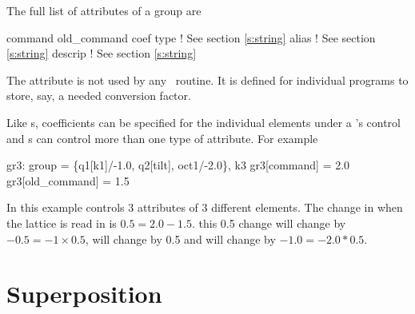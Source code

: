 The full list of attributes of a group are
\begin{example}
  command         
  old_command     
  coef            
  type            ! See section \ref{s:string}
  alias           ! See section \ref{s:string}
  descrip         ! See section \ref{s:string}
\end{example}
The  attribute is not used by any \bmad\ routine. It is
defined for individual programs to store, say, a needed conversion
factor.

Like s, coefficients can be specified for the individual
elements under a 's control and s can control more
than one type of attribute. For example
\begin{example}
  gr3: group = \{q1[k1]/-1.0, q2[tilt], oct1/-2.0\}, k3
  gr3[command] = 2.0
  gr3[old_command] = 1.5
\end{example}
In this example  controls 3 attributes of 3 different
elements.  The change in  when the lattice is read in is $0.5
= 2.0 - 1.5$.  this 0.5 change will change  by $-0.5 = -1
\times 0.5$,  will change by 0.5 and  will
change by $-1.0 = -2.0 * 0.5$.

\section{Superposition}
\label{s:super}

